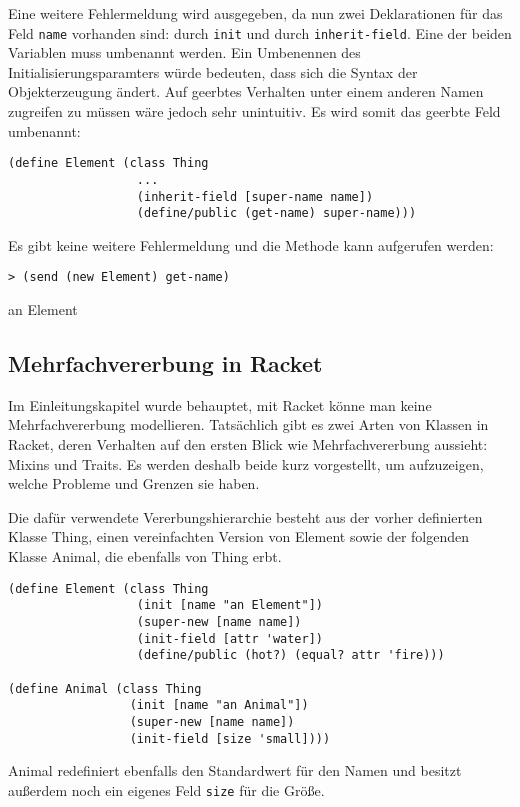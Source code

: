 Eine weitere Fehlermeldung wird ausgegeben, da nun zwei Deklarationen für das Feld \texttt{name} vorhanden sind: durch \texttt{init} und durch \texttt{inherit-field}. Eine der beiden Variablen muss umbenannt werden. Ein Umbenennen des Initialisierungsparamters würde bedeuten, dass sich die Syntax der Objekterzeugung ändert. Auf geerbtes Verhalten unter einem anderen Namen zugreifen zu müssen wäre jedoch sehr unintuitiv. Es wird somit das geerbte Feld umbenannt:

\begin{lstlisting}
(define Element (class Thing 
                  ...
                  (inherit-field [super-name name])
                  (define/public (get-name) super-name)))
\end{lstlisting}

Es gibt keine weitere Fehlermeldung und die Methode kann aufgerufen werden:

\begin{lstlisting}
> (send (new Element) get-name)
\end{lstlisting}
{\routput {\qq}an Element\qq}

\subsection{Mehrfachvererbung in Racket}
\label{mixins}
Im Einleitungskapitel wurde behauptet, mit Racket könne man keine Mehrfachvererbung modellieren. Tatsächlich gibt es zwei Arten von Klassen in Racket, deren Verhalten auf den ersten Blick wie Mehrfachvererbung aussieht: Mixins und Traits. Es werden deshalb beide kurz vorgestellt, um aufzuzeigen, welche Probleme und Grenzen sie haben.

Die dafür verwendete Vererbungshierarchie besteht aus der vorher definierten Klasse Thing, einen vereinfachten Version von Element sowie der folgenden Klasse Animal, die ebenfalls von Thing erbt.
\newpage
\begin{lstlisting}
(define Element (class Thing 
                  (init [name "an Element"])
                  (super-new [name name])
                  (init-field [attr 'water])
                  (define/public (hot?) (equal? attr 'fire)))

(define Animal (class Thing
                 (init [name "an Animal"])
                 (super-new [name name])
                 (init-field [size 'small])))
\end{lstlisting}

Animal redefiniert ebenfalls den Standardwert für den Namen und besitzt außerdem noch ein eigenes Feld \texttt{size} für die Größe.

